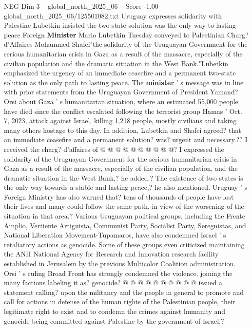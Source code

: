 \begin{textsample}{NEG Dim 3 – global\_north\_2025\_06 – Score -1.00 – global\_north\_2025\_06/125501082.txt}  \label{ex:f3_neg_355}
Uruguay expresses solidarity with Palestine Lubetkin insisted the two-state solution was the only way to lasting peace Foreign \textbf{Minister} Mario Lubetkin Tuesday conveyed to Palestinian Charg? d'Affaires Mohammed Shafei"the solidarity of the Uruguayan Government for the serious humanitarian crisis in Gaza as a result of the massacre, especially of the civilian population and the dramatic situation in the West Bank."Lubetkin emphasized the urgency of an immediate ceasefire and a permanent two-state solution as the only path to lasting peace.
The \textbf{minister} ' s message was in line with prior statements from the Uruguayan Government of President Yamand?
Orsi about Gaza ' s humanitarian situation, where an estimated 55,000 people have died since the conflict escalated following the terrorist group Hamas ' Oct. 7, 2023, attack against Israel, killing 1,218 people, mostly civilians and taking many others hostage to this day.
In addition, Lubetkin and Shafei agreed? that an immediate ceasefire and a permanent solution? was? urgent and necessary.??
I received the charg? d'affaires of @ @ @ @ @ @ @ @ @ @?
I expressed the solidarity of the Uruguayan Government for the serious humanitarian crisis in Gaza as a result of the massacre, especially of the civilian population, and the dramatic situation in the West Bank,? he added.?
The existence of two states is the only way towards a stable and lasting peace,? he also mentioned.
Uruguay ' s Foreign Ministry has also warned that? tens of thousands of people have lost their lives and many could follow the same path, in view of the worsening of the situation in that area.?
Various Uruguayan political groups, including the Frente Amplio, Vertiente Artiguista, Communist Party, Socialist Party, Seregnistas, and National Liberation Movement-Tupamaros, have also condemned Israel ' s retaliatory actions as genocide.
Some of these groups even criticized maintaining the ANII National Agency for Research and Innovation research facility established in Jerusalem by the previous Multicolor Coalition administration.
Orsi ' s ruling Broad Front has strongly condemned the violence, joining the many factions labeling it as? genocide? @ @ @ @ @ @ @ @ @ @ issued a statement calling? upon the militancy and the people in general to promote and call for actions in defense of the human rights of the Palestinian people, their legitimate right to exist and to condemn the crimes against humanity and genocide being committed against Palestine by the government of Israel.?

\end{textsample}
